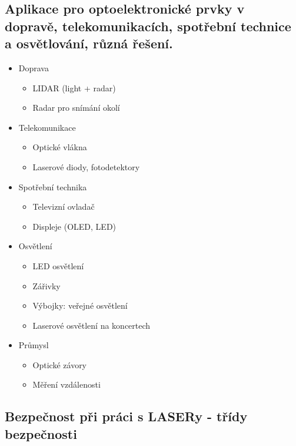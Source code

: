 \documentclass[a4paper, 12pt]{article}
\begin{document}
        \subsection{Aplikace pro optoelektronické prvky v dopravě, telekomunikacích, spotřební technice a osvětlování, různá řešení.}
            \begin{itemize}
                \item Doprava
                \begin{itemize}
                    \item LIDAR (light + radar)
                    \item Radar pro snímání okolí
                \end{itemize}
                \item Telekomunikace
                \begin{itemize}
                    \item Optické vlákna
                    \item Laserové diody, fotodetektory
                \end{itemize}
                \item Spotřební technika
                \begin{itemize}
                    \item Televizní ovladač
                    \item Displeje (OLED, LED)
                \end{itemize}
                \item Osvětlení
                \begin{itemize}
                    \item LED osvětlení
                    \item Zářivky
                    \item Výbojky: veřejné osvětlení
                    \item Laserové osvětlení na koncertech
                \end{itemize}
                \item Průmysl
                \begin{itemize}
                    \item Optické závory 
                    \item Měření vzdálenosti
                \end{itemize}
            \end{itemize}

        \subsection{Bezpečnost při práci s LASERy - třídy bezpečnosti}
\end{document}
